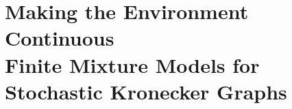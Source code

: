 \chapter{Making the Environment Continuous \\ {\Large Finite Mixture Models for Stochastic Kronecker Graphs}}
\label{chap:skgfmm}


